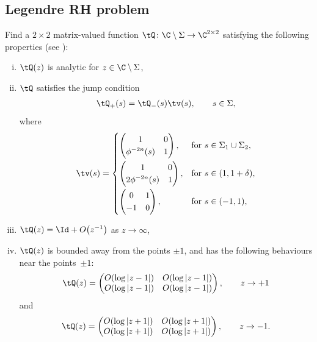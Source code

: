 \subsection{Legendre RH problem}\label{LegRHP} Find a $2\times2$ matrix-valued function $\tQ \colon \C \setminus \Sigma \to \C^{2\times2}$ satisfying the following properties (see \cite[Section~3.4]{CD}):
\begin{enumerate}[(i)]\itemsep=0pt
 \item $\tQ(z)$ is analytic for $z \in \C \setminus \Sigma$,
 \item $\tQ$ satisfies the jump condition
 \begin{align*}
 \tQ_+(s) = \tQ_-(s) \tv(s), \qquad s\in \Sigma,
 \end{align*}
 where
 \begin{align*}
\tv(s) =
\begin{cases}
\begin{pmatrix}
1 & 0
\\
\phi^{-2n}(s) & 1
\end{pmatrix}, & \mbox{for}\ s \in \Sigma_1 \cup \Sigma_2,\vspace{1mm}
\\
\begin{pmatrix}
1 & 0
\\
2\phi^{-2n}(s) & 1
\end{pmatrix}, & \mbox{for}\ s\in(1,1+\delta),\vspace{1mm}
\\
\begin{pmatrix}
0 & 1
\\
-1 & 0
\end{pmatrix}, & \mbox{for}\ s \in (-1,1),
\end{cases}
\end{align*}
\item $\tQ(z) = \Id + O\big(z^{-1}\big)$ as $z \rightarrow \infty$,
\item $\tQ(z)$ is bounded away from the points $\pm 1$, and has the following behaviours near the points~$\pm1$:
\begin{align*}
 \tQ(z) = \begin{pmatrix}
 O(\log|z-1|) & O(\log|z-1|)
 \\
 O(\log|z-1|) & O(\log|z-1|)
 \end{pmatrix}, \qquad z\to +1
\end{align*}
and
\begin{align*}
 \tQ(z) = \begin{pmatrix}
 O(\log|z+1|) & O(\log|z+1|)
 \\
 O(\log|z+1|) & O(\log|z+1|)
 \end{pmatrix}, \qquad z \to -1.
\end{align*}
\end{enumerate}

